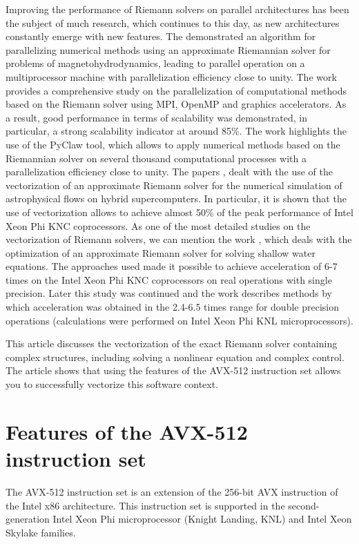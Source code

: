 \documentclass[utf8,english]{psta}%
\begin{document}
Improving the performance of Riemann solvers on parallel architectures has been the subject of much research, which continues to this day, as new architectures constantly emerge with new features.
The \cite{Shumlak} demonstrated an algorithm for parallelizing numerical methods using an approximate Riemannian solver for problems of magnetohydrodynamics, leading to parallel operation on a multiprocessor machine with parallelization efficiency close to unity.
The work \cite{Schive} provides a comprehensive study on the parallelization of computational methods based on the Riemann solver using MPI, OpenMP and graphics accelerators.
As a result, good performance in terms of scalability was demonstrated, in particular, a strong scalability indicator at around 85\%.
The \cite{Mandli} work highlights the use of the PyClaw tool, which allows to apply numerical methods based on the Riemannian solver on several thousand computational processes with a parallelization efficiency close to unity.
The papers \cite{Kulikov}, \cite{Kulikov2} dealt with the use of the vectorization of an approximate Riemann solver for the numerical simulation of astrophysical flows on hybrid supercomputers.
In particular, it is shown that the use of vectorization allows to achieve almost 50\% of the peak performance of Intel Xeon Phi KNC coprocessors.
As one of the most detailed studies on the vectorization of Riemann solvers, we can mention the work \cite{BaderSWEVect}, which deals with the optimization of an approximate Riemann solver for solving shallow water equations.
The approaches used made it possible to achieve acceleration of 6-7 times on the Intel Xeon Phi KNC coprocessors on real operations with single precision.
Later this study was continued and the work \cite{FerreiraSWEVect} describes methods by which acceleration was obtained in the 2.4-6.5 times range for double precision operations (calculations were performed on Intel Xeon Phi KNL microprocessors).

This article discusses the vectorization of the exact Riemann solver containing complex structures, including solving a nonlinear equation and complex control.
The article shows that using the features of the AVX-512 instruction set allows you to successfully vectorize this software context.

\section{Features of the AVX-512 instruction set}

The AVX-512 instruction set is an extension of the 256-bit AVX instruction of the Intel x86 architecture.
This instruction set is supported in the second-generation Intel Xeon Phi microprocessor (Knight Landing, KNL) and Intel Xeon Skylake families.
\end{document}
